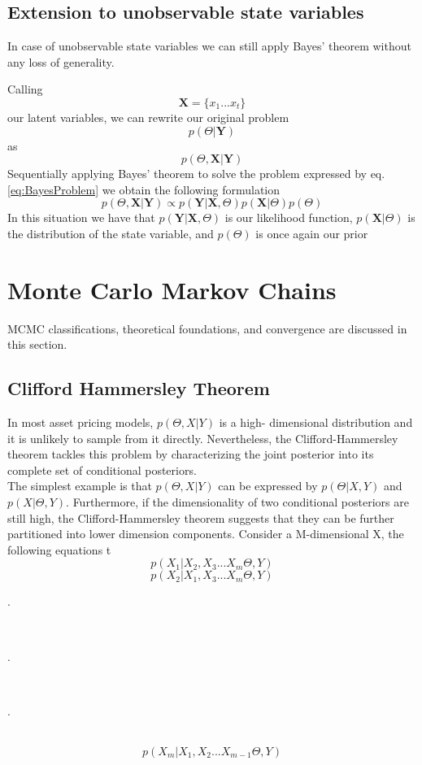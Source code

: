 \documentclass[letterpaper]{article}
\begin{document}
\subsection{Extension to unobservable state variables}
In case of unobservable state variables we can still apply Bayes' theorem without any loss of generality.

Calling 
\begin{equation*}
\textbf{X}=\{x_1...x_t \}
\end{equation*}
our latent variables, we can rewrite our original problem
\begin{equation*}
p(\textbf{$\Theta$}|\textbf{Y})
\end{equation*}
as 
\begin{equation}
p(\textbf{$\Theta$},\textbf{X}|\textbf{Y})
\label{eq:BayesProblem}
\end{equation}
Sequentially applying  Bayes' theorem to solve the problem expressed by eq. \ref{eq:BayesProblem} we obtain the following formulation
\begin{equation}
p(\textbf{$\Theta$},\textbf{X}|\textbf{Y})\propto p(\textbf{Y}|\textbf{X},\textbf{$\Theta$})p(\textbf{X}|\textbf{$\Theta$})p(\textbf{$\Theta$})
\end{equation}
In this situation we have that $p(\textbf{Y}|\textbf{X},\textbf{$\Theta$})$ is our likelihood function, $p(\textbf{X}|\textbf{$\Theta$})$ is the distribution of the state variable, and $p(\textbf{$\Theta$})$ is once again our prior
\section{Monte Carlo Markov Chains}
MCMC classifications, theoretical foundations, and convergence are discussed in this section.
\subsection{Clifford Hammersley Theorem}
In most asset pricing models, $p(\Theta,X|Y)$ is a high- dimensional distribution and it is unlikely to sample from it directly. Nevertheless, the Clifford-Hammersley theorem tackles this problem by characterizing the joint posterior into its complete set of conditional posteriors. \\

The simplest example is that $p(\Theta,X|Y)$ can be expressed by $p(\Theta|X,Y)$ and $p(X|\Theta,Y)$. Furthermore, if the dimensionality of two conditional posteriors are still high, the Clifford-Hammersley theorem suggests that they can be further partitioned into lower dimension components. Consider a M-dimensional X, the following equations 
t
\begin{equation}
p(X_1|X_2,X_3...X_m\Theta,Y)
\end{equation}
\begin{equation}
p(X_2|X_1,X_3...X_m\Theta,Y)
\end{equation}
\centerline{.}\\
\centerline{.}\\
\centerline{.}\\
\begin{equation}
p(X_m|X_1,X_2...X_{m-1}\Theta,Y)
\end{equation}
\end{document}

